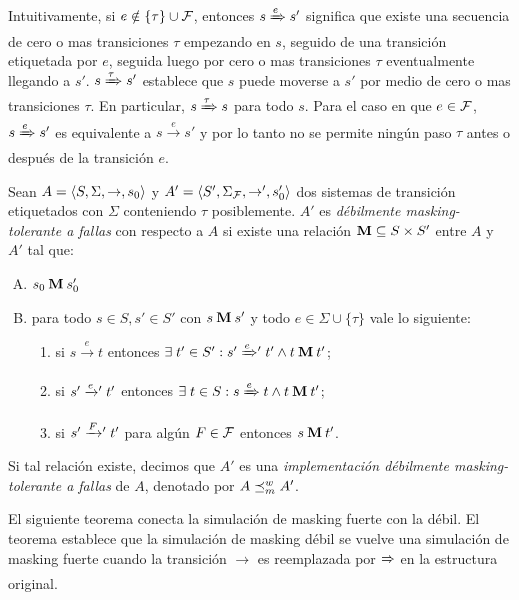Intuitivamente, si $e \notin \{\tau\}\cup\mathcal{F}$, entonces $s\xRightarrow{e}s'$ significa que existe una secuencia de cero o mas transiciones $\tau$ empezando en $s$, seguido de una transición etiquetada por $e$, seguida luego por cero o mas transiciones $\tau$ eventualmente llegando a  $s'$.
$s \xRightarrow{\tau} s'$ establece que $s$ puede moverse a $s'$ por medio de cero o mas transiciones $\tau$.
%
En particular, $s \xRightarrow{\tau} s$ para todo $s$.
%
Para el caso en que $e\in\mathcal{F}$,
$s\xRightarrow{e}s'$ es equivalente a $s\xrightarrow{e}s'$ y por lo tanto no se permite ningún paso $\tau$ antes o después de la transición $e$.

\begin{definition} \label{def:weak_mask}
  Sean $A =\langle S, \Sigma, \rightarrow, s_0 \rangle$ y $A' =\langle S',
  \Sigma_{\mathcal{F}}, \rightarrow', s'_0 \rangle$ dos sistemas de transición etiquetados con $\Sigma$
  conteniendo $\tau$ posiblemente.  $A'$ es \emph{débilmente masking-tolerante a fallas}
  con respecto a $A$ si existe una relación $\mathbin{\mathbf{M}} \subseteq S
  \times S'$ entre $A$ y $A'$ tal que:

\begin{enumerate}[(A)]
  \item $s_0 \mathbin{\mathbf{M}} s'_0$
  \item para todo $s \in S, s' \in S'$ con $s \mathbin{\mathbf{M}} s'$ y todo $e \in \Sigma \cup \{\tau\}$ vale lo siguiente:

  \begin{enumerate}[(1)]
    \item si $s \xrightarrow{e} t$ entonces 
    $\exists\; t' \in S': s' \mathrel{{\xRightarrow[]{e}}{}'} t' 
    \wedge t \mathbin{\mathbf{M}} t'$;

      \item si $s' \mathrel{{\xrightarrow[]{e}}{}'} t'$ entonces  
      $\exists \; t \in S: s \xRightarrow{e} t  
      \wedge t \mathbin{\mathbf{M}} t'$;

      \item si $s' \mathrel{{\xrightarrow[]{F}}{}'} t'$ para algún $F \in \mathcal{F}$ entonces 
      $s \mathbin{\mathbf{M}} t'$.
  \end{enumerate}
\end{enumerate}

%
Si tal relación existe, decimos que $A'$ es una \emph{implementación débilmente masking-tolerante a fallas} de
$A$, denotado por $A \preceq^w_{m} A'$.
\end{definition}

El siguiente teorema conecta la simulación de masking fuerte con la débil. El teorema establece que la simulación de masking débil se vuelve una simulación de masking fuerte cuando la transición $\xrightarrow{}$ es reemplazada por $\xRightarrow{}$ en la estructura original.

